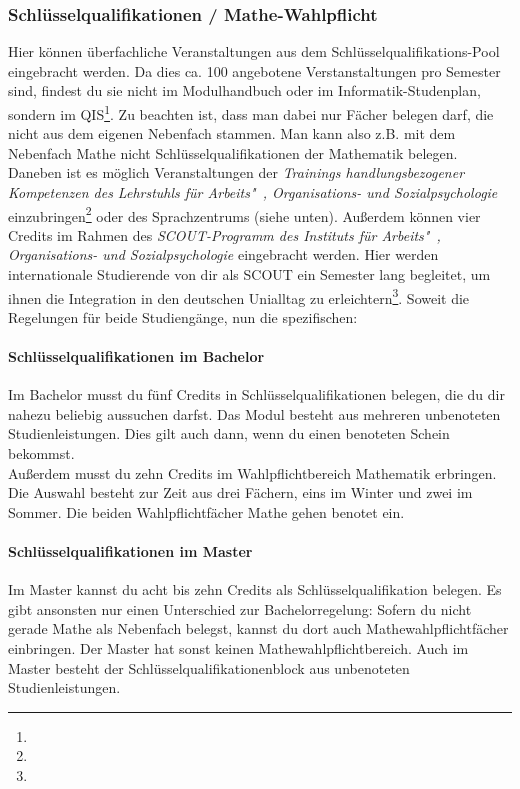 	\subsubsection{Schlüsselqualifikationen / Mathe-Wahl\-pflicht}
	Hier können überfachliche Veranstaltungen aus dem Schlüsselqualifikations-Pool eingebracht werden. Da dies ca. 100 angebotene Verstanstaltungen pro Semester sind, findest du sie nicht im Modulhandbuch oder im Informatik-Studenplan, sondern im QIS\footnote{}.
	 Zu beachten ist, dass man dabei nur Fächer belegen darf, die nicht aus dem eigenen Nebenfach stammen. Man kann also z.B. mit dem Nebenfach Mathe nicht Schlüsselqualifikationen der Mathematik belegen.
	 Daneben ist es möglich Veranstaltungen der \textit{Trainings handlungsbezogener Kompetenzen des Lehrstuhls für Arbeits"~, Organisations- und Sozialpsychologie} einzubringen\footnote{} oder des Sprachzentrums (siehe unten).
	Außerdem können vier Credits im Rahmen des \textit{SCOUT-Programm des Instituts für Arbeits"~, Organisations- und Sozialpsychologie} eingebracht werden. Hier werden internationale Studierende von dir als SCOUT ein Semester lang begleitet, um ihnen die Integration in den deutschen Unialltag zu erleichtern\footnote{}. Soweit die Regelungen für beide Studiengänge, nun die spezifischen:

	\paragraph*{Schlüsselqualifikationen im Bachelor}
	Im Bachelor musst du fünf Credits in Schlüsselqualifikationen belegen, die du dir nahezu beliebig aussuchen darfst. Das Modul besteht aus mehreren unbenoteten Studienleistungen. Dies gilt auch dann, wenn du einen benoteten Schein bekommst.\\
	Außerdem musst du zehn Credits im Wahlpflichtbereich Mathematik erbringen. Die Auswahl besteht zur Zeit aus drei Fächern, eins im Winter und zwei im Sommer. Die beiden Wahlpflichtfächer Mathe gehen benotet ein.

	\paragraph*{Schlüsselqualifikationen im Master}
	Im Master kannst du acht bis zehn Credits als Schlüsselqualifikation belegen. Es gibt ansonsten nur einen Unterschied zur Bachelorregelung: Sofern du nicht gerade Mathe als Nebenfach belegst, kannst du dort auch Mathewahlpflichtfächer einbringen. Der Master hat sonst keinen Mathewahlpflichtbereich. Auch im Master besteht der Schlüsselqualifikationenblock aus unbenoteten Studienleistungen.

